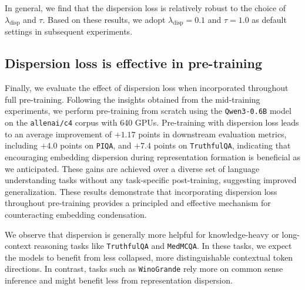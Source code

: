 \documentclass{article}
\theoremstyle{plain}
\theoremstyle{definition}
\theoremstyle{remark}
\begin{document}
In general, we find that the dispersion loss is relatively robust to the choice of $\lambda_{\text{disp}}$ and $\tau$. Based on these results, we adopt $\lambda_{\text{disp}} = 0.1$ and $\tau = 1.0$ as default settings in subsequent experiments.

\vspace{-4pt}
\subsection{Dispersion loss is effective in pre-training}
\label{sec:pre_training}

Finally, we evaluate the effect of dispersion loss when incorporated throughout full pre-training. Following the insights obtained from the mid-training experiments, we perform pre-training from scratch using the \texttt{Qwen3-0.6B} model on the \texttt{allenai/c4} corpus with 640 GPUs. Pre-training with dispersion loss leads to an average improvement of $+1.17$ points in downstream evaluation metrics, including $+4.0$ points on \texttt{PIQA}, and $+7.4$ points on \texttt{TruthfulQA}, indicating that encouraging embedding dispersion during representation formation is beneficial as we anticipated. These gains are achieved over a diverse set of language understanding tasks without any task-specific post-training, suggesting improved generalization. These results demonstrate that incorporating dispersion loss throughout pre-training provides a principled and effective mechanism for counteracting embedding condensation.

We observe that dispersion is generally more helpful for knowledge-heavy or long-context reasoning tasks like \texttt{TruthfulQA} and \texttt{MedMCQA}. In these tasks, we expect the models to benefit from less collapsed, more distinguishable contextual token directions. In contrast, tasks such as \texttt{WinoGrande} rely more on common sense inference and might benefit less from representation dispersion.
\end{document}
